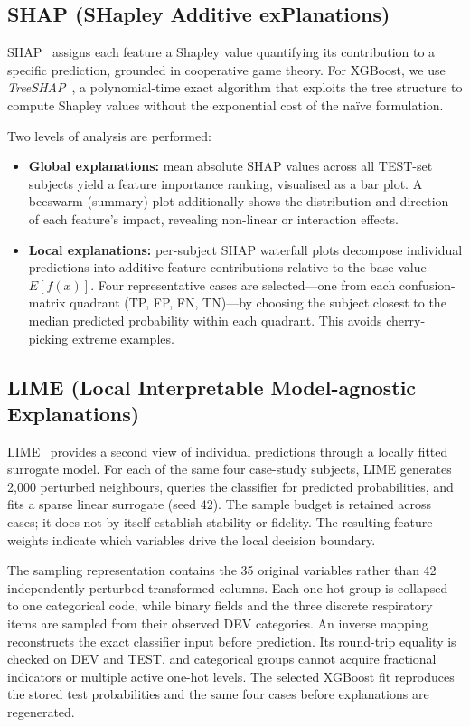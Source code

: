 \subsection{SHAP (SHapley Additive exPlanations)}
\label{subsec:methods_shap}
\gls{SHAP}~\cite{lundberg2017shap} assigns each feature a Shapley value quantifying its contribution to a specific prediction, grounded in cooperative game theory.
For XGBoost, we use \textit{TreeSHAP}~\cite{lundberg2020treeshap}, a polynomial-time exact algorithm that exploits the tree structure to compute Shapley values without the exponential cost of the na\"ive formulation.

Two levels of analysis are performed:
\begin{itemize}
  \item \textbf{Global explanations:} mean absolute \gls{SHAP} values across all \gls{TEST}-set subjects yield a feature importance ranking, visualised as a bar plot.
    A beeswarm (summary) plot additionally shows the distribution and direction of each feature's impact, revealing non-linear or interaction effects.
  \item \textbf{Local explanations:} per-subject \gls{SHAP} waterfall plots decompose individual predictions into additive feature contributions relative to the base value $E[f(x)]$.
    Four representative cases are selected---one from each confusion-matrix quadrant (\gls{TP}, \gls{FP}, \gls{FN}, \gls{TN})---by choosing the subject closest to the median predicted probability within each quadrant.
    This avoids cherry-picking extreme examples.
\end{itemize}

\subsection{LIME (Local Interpretable Model-agnostic Explanations)}
\label{subsec:methods_lime}
\gls{LIME}~\cite{ribeiro2016lime} provides a second view of individual predictions through a locally fitted surrogate model.
For each of the same four case-study subjects, \gls{LIME} generates 2{,}000 perturbed neighbours, queries the classifier for predicted probabilities, and fits a sparse linear surrogate (seed 42). The sample budget is retained across cases; it does not by itself establish stability or fidelity.
The resulting feature weights indicate which variables drive the local decision boundary.

The sampling representation contains the 35 original variables rather than 42 independently perturbed transformed columns. Each one-hot group is collapsed to one categorical code, while binary fields and the three discrete respiratory items are sampled from their observed DEV categories. An inverse mapping reconstructs the exact classifier input before prediction. Its round-trip equality is checked on DEV and TEST, and categorical groups cannot acquire fractional indicators or multiple active one-hot levels. The selected XGBoost fit reproduces the stored test probabilities and the same four cases before explanations are regenerated.

